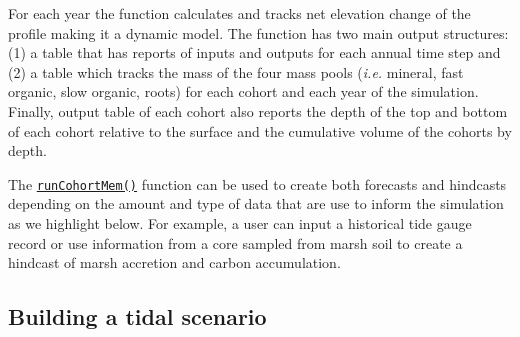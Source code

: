 For each year the function calculates and tracks net elevation change of
the profile making it a dynamic model. The function has two main output
structures: (1) a table that has reports of inputs and outputs for each
annual time step and (2) a table which tracks the mass of the four mass
pools (\emph{i.e.} mineral, fast organic, slow organic, roots) for each
cohort and each year of the simulation. Finally, output table of each
cohort also reports the depth of the top and bottom of each cohort
relative to the surface and the cumulative volume of the cohorts by
depth.

The \protect\hyperlink{runcohortmem}{\texttt{runCohortMem()}} function
can be used to create both forecasts and hindcasts depending on the
amount and type of data that are use to inform the simulation as we
highlight below. For example, a user can input a historical tide gauge
record or use information from a core sampled from marsh soil to create
a hindcast of marsh accretion and carbon accumulation.

\hypertarget{building-a-tidal-scenario}{%
\subsection{Building a tidal scenario}\label{building-a-tidal-scenario}}

